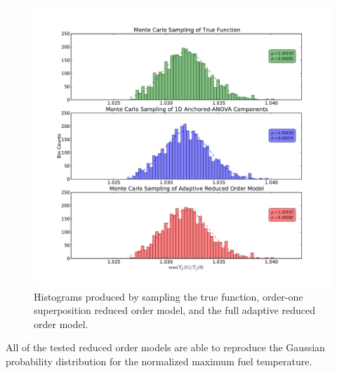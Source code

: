 \begin{figure}
\caption{\label{fig:pk_histograms}
Histograms produced by sampling the true function, order-one superposition reduced order model, and the full adaptive reduced order model.  
}
 \begin{center}
  \includegraphics[scale=.58]{./Chapter3/pk_histograms.pdf}
 \end{center}
\end{figure}
All of the tested reduced order models are able to reproduce the Gaussian probability distribution for the normalized maximum fuel temperature. 

